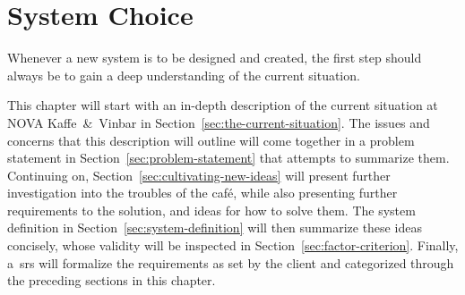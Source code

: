 \chapter{System Choice}\label{ch:system-choice}

Whenever a new system is to be designed and created, the first step should always be to gain a deep understanding of the
current situation.

This chapter will start with an in-depth description of the current situation at NOVA Kaffe~\&~Vinbar in
Section~\ref{sec:the-current-situation}.
The issues and concerns that this description will outline will come together in a problem statement in
Section~\ref{sec:problem-statement} that attempts to summarize them.
Continuing on, Section~\ref{sec:cultivating-new-ideas} will present further investigation into the troubles of the café,
while also presenting further requirements to the solution, and ideas for how to solve them.
The system definition in Section~\ref{sec:system-definition} will then summarize these ideas concisely, whose validity
will be inspected in Section~\ref{sec:factor-criterion}.
Finally, a~\acrfull{srs} will formalize the requirements as set by the client and categorized through the preceding
sections in this chapter.







